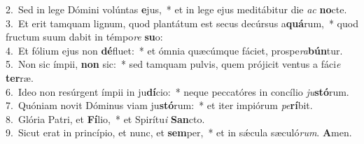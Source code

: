 {2.~}Sed in lege Dómini volúntas \textbf{e}jus,~* et in lege ejus meditábitur die \textit{ac} \textbf{no}cte.\\
{3.~}Et erit tamquam lignum, quod plantátum est secus decúrsus a\textbf{quá}rum,~* quod fructum suum dabit in témpo\textit{re} \textbf{su}o:\\
{4.~}Et fólium ejus non \textbf{dé}fluet:~* et ómnia quæcúmque fáciet, prospe\textit{ra}\textbf{bún}tur.\\
{5.~}Non sic ímpii, \textbf{non} sic:~* sed tamquam pulvis, quem prójicit ventus a fáci\textit{e} \textbf{ter}ræ.\\
{6.~}Ideo non resúrgent ímpii in ju\textbf{dí}cio:~* neque peccatóres in concílio \textit{ju}\textbf{stó}rum.\\
{7.~}Quóniam novit Dóminus viam ju\textbf{stó}rum:~* et iter impiórum \textit{pe}\textbf{rí}bit.\\
{8.~}Glória Patri, et \textbf{Fí}lio,~* et Spirítu\textit{i} \textbf{San}cto.\\
{9.~}Sicut erat in princípio, et nunc, et \textbf{sem}per,~* et in sǽcula sæculó\textit{rum}. \textbf{A}men.\\
